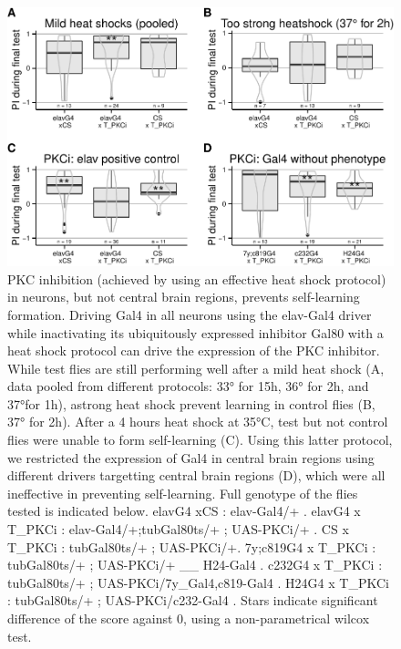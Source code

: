 \documentclass[]{article}
\begin{document}
\begin{figure}[htbp]
\centering
\includegraphics{firsttest_files/figure-latex/unnamed-chunk-3-1.pdf}
\caption{\label{fig:heatshock} PKC inhibition (achieved by using an
effective heat shock protocol) in neurons, but not central brain
regions, prevents self-learning formation. Driving Gal4 in all neurons
using the elav-Gal4 driver while inactivating its ubiquitously expressed
inhibitor Gal80 with a heat shock protocol can drive the expression of
the PKC inhibitor. While test flies are still performing well after a
mild heat shock (A, data pooled from different protocols: 33° for 15h,
36° for 2h, and 37°for 1h), astrong heat shock prevent learning in
control flies (B, 37° for 2h). After a 4 hours heat shock at 35°C, test
but not control flies were unable to form self-learning (C). Using this
latter protocol, we restricted the expression of Gal4 in central brain
regions using different drivers targetting central brain regions (D),
which were all ineffective in preventing self-learning. Full genotype of
the flies tested is indicated below. elavG4 xCS : elav-Gal4/+ . elavG4 x
T\_PKCi : elav-Gal4/+;tubGal80ts/+ ; UAS-PKCi/+ . CS x T\_PKCi :
tubGal80ts/+ ; UAS-PKCi/+. 7y;c819G4 x T\_PKCi : tubGal80ts/+ ;
UAS-PKCi/+ \_\_ H24-Gal4 . c232G4 x T\_PKCi : tubGal80ts/+ ;
UAS-PKCi/7y\_Gal4,c819-Gal4 . H24G4 x T\_PKCi : tubGal80ts/+ ;
UAS-PKCi/c232-Gal4 . Stars indicate significant difference of the score
against 0, using a non-parametrical wilcox test.}
\end{figure}
\end{document}
